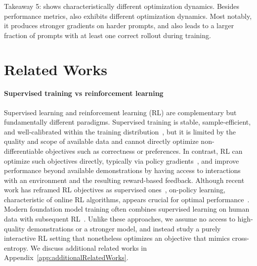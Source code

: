 \documentclass[10pt]{article} %
\begin{document}
\begin{AIbox}{Takeaway 5: \ours{} shows characteristically different optimization dynamics.}
Besides performance metrics, \ours{} also exhibits different optimization dynamics. Most notably, it produces stronger gradients on harder prompts, and also leads to a larger fraction of prompts with at least one correct rollout during training.
\end{AIbox}

\section{Related Works} 
\label{sec:relatedWorks}

\paragraph{Supervised training vs reinforcement learning} Supervised learning and reinforcement learning (RL) are complementary but fundamentally different paradigms. Supervised training is stable, sample-efficient, and well-calibrated within the training distribution~\citep{ngNIPS2001}, but it is limited by the quality and scope of available data and cannot directly optimize non-differentiable objectives such as correctness or preferences. In contrast, RL can optimize such objectives directly, typically via policy gradients~\citep{williams1992simple,sutton1999policy,sutton1998reinforcement,schulman2017proximalpolicyoptimizationalgorithms,guo2017calibrationmodernneuralnetworks}, and improve performance beyond available demonstrations by having access to interactions with an environment and the resulting reward-based feedback. Although recent work has reframed RL objectives as supervised ones~\citep{rafailov2024directpreferenceoptimizationlanguage}, on-policy learning, characteristic of online RL algorithms, appears crucial for optimal performance~\citep{tajwar2024preferencefinetuningllmsleverage,xu2024dposuperiorppollm}. Modern foundation model training often combines supervised learning on human data with subsequent RL~\citep{ouyang2022traininglanguagemodelsfollow}. Unlike these approaches, we assume no access to high-quality demonstrations or a stronger model, and instead study a purely interactive RL setting that nonetheless optimizes an objective that mimics cross-entropy. We discuss additional related works in Appendix~\ref{app:additionalRelatedWorks}.
\end{document}
